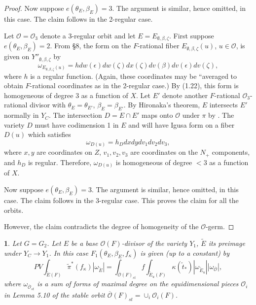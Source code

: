 \documentclass[12pt,letterpaper]{amsart}
\newcommand{\ooo}{\mathcal{O}}
\newcommand{\ovo}{\overline{\mathcal{O}}}
\newcommand{\proclaimname}{}
\newtheorem*{proclaimx}{\proclaimname}
\newenvironment{proclaim}[1]%
  {\renewcommand{\proclaimname}{#1}\begin{proclaimx}}{\end{proclaimx}}
\begin{document}
\begin{proof}
Now suppose $e(\theta_E,\beta_E)=3$. The argument is similar,
hence omitted, in this case. The claim follows in the
2-regular case.

Let ${\mathcal O}={\mathcal O}_3$ denote a 3-regular orbit and let
$E=E_{\emptyset, \beta,\zeta}$.
First suppose $e(\theta_E,\beta_E)=2$.
From \S 8, the form on the $F$-rational fiber
$E_{\emptyset,\beta,\zeta}(u)$, $u\in {\mathcal O}$, is given
on $Y''_{\emptyset,\beta,\zeta}$ by
\[
\omega_{E_{\emptyset,\beta,\zeta}(u)}
=h dw(\epsilon)dw(\zeta)dx(\zeta)dv(\beta)dv(\epsilon)dv(\zeta),
\tag{5.16}
\]
where $h$ is a regular function.
(Again, these coordinates may be ``averaged to obtain $F$-rational
coordinates as in the 2-regular case.)
By (1.22), this form is homogeneous
of degree 3 as a function of $X$. Let $E'$ denote another
$F$-rational ${\mathcal O}_3$-rational divisor with
$\theta_E=\theta_{E'}$, $\beta_E =\beta_{E'}$. By Hironaka's theorem,
$E$ intersects $E'$ normally in $Y_C$. The intersection $D=E\cap E'$
maps onto ${\mathcal O}$ under $\pi$ by \cite[chap II, Prop 3.1]{DG80}.
The variety $D$ must have codimension 1 in $E$ and will have Igusa form on
a fiber $D(u)$ which satisfies
\[
\omega_{D(u)}=h_Ddx dy dv_1dv_2dv_3,
\]
where $x,y$ are coordinates on $Z$, $v_1,v_2,v_3$ are coordinates on the
$N_+$ components, and $h_D$ is regular. Therefore, $\omega_{D(u)}$
is homogeneous of degree $<3$ as a function of $X$.

Now suppose $e(\theta_E,\beta_E)=3$. The argument is similar,
hence omitted, in this case. The claim follows in the
3-regular case.
This proves the claim for all the orbits.

However, the claim
contradicts the degree of homogeneity of the $\ooo$-germ.
\end{proof}

\begin{proclaim}{Lemma 5.17} Let $G=G_2$.
Let $E$ be a base ${\mathcal O}(F)$-divisor of the
variety $Y_1$, $\tilde{E}$ its preimage under
$Y_C\rightarrow Y_1$.
In this case $F_1(\theta_E,\beta_E,f_\kappa)$ is given
(up to a constant) by
\[
PV\int_{\tilde{E}(F)}\tilde{\pi}^*(f_\kappa) |\omega_{\tilde{E}}|
=\int_{\ovo(F)_{st}}f
\int_{\tilde{E}_u(F)}\kappa(\tilde{t}_*)
|\omega_{\tilde{E}_u}||\omega_{\ovo}|,
\]
where $\omega_{\ovo_{st}}$
is a sum of forms of maximal degree on the
equidimensional pieces ${\mathcal O}_i$ in Lemma 5.10 of the stable
orbit $\ovo(F)_{st}=\cup_i{\mathcal O}_i(F)$.
\end{proclaim}
\end{document}
